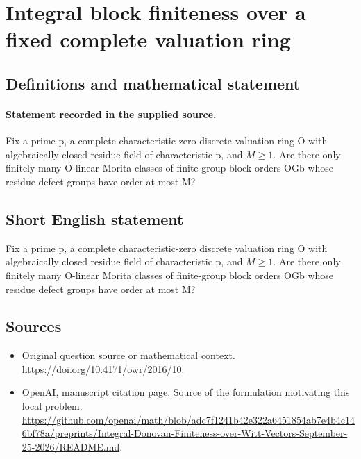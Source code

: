 \documentclass[11pt]{article}
\begin{document}
\section*{Integral block finiteness over a fixed complete valuation ring}\label{30006997}
\subsection{Definitions and mathematical statement}
\paragraph{Statement recorded in the supplied source.}
Fix a prime p, a complete characteristic-zero discrete valuation ring O with algebraically closed residue field of characteristic p, and $M\geq 1$. Are there only finitely many O-linear Morita classes of finite-group block orders OGb whose residue defect groups have order at most M?
\subsection{Short English statement}
Fix a prime p, a complete characteristic-zero discrete valuation ring O with algebraically closed residue field of characteristic p, and $M\geq 1$. Are there only finitely many O-linear Morita classes of finite-group block orders OGb whose residue defect groups have order at most M?
\subsection{Sources}
\begin{itemize}
\item[S1] Original question source or mathematical context.
\url{https://doi.org/10.4171/owr/2016/10}.
\item[S2] OpenAI, manuscript citation page. Source of the formulation motivating this local problem.
\url{https://github.com/openai/math/blob/adc7f1241b42e322a6451854ab7e4b4c146bf78a/preprints/Integral-Donovan-Finiteness-over-Witt-Vectors-September-25-2026/README.md}.
\end{itemize}
\end{document}
